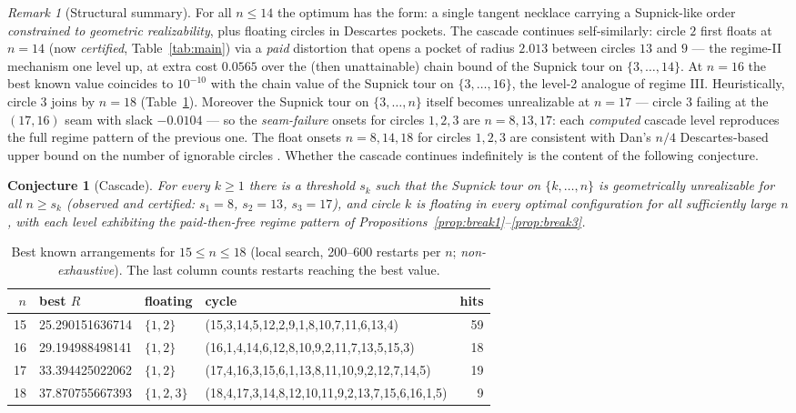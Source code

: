 \documentclass[11pt]{article}
\newtheorem{conjecture}[theorem]{Conjecture}
\theoremstyle{definition}
\theoremstyle{remark}
\newtheorem{remark}[theorem]{Remark}
\begin{document}
\begin{remark}[Structural summary]
For all $n\le14$ the optimum has the form: a single tangent necklace carrying a Supnick-like order \emph{constrained to geometric realizability}, plus floating circles in Descartes pockets. The cascade continues self-similarly: circle $2$ first floats at $n=14$ (now \emph{certified}, Table~\ref{tab:main}) via a \emph{paid} distortion that opens a pocket of radius $2.013$ between circles $13$ and $9$ --- the regime-II mechanism one level up, at extra cost $0.0565$ over the (then unattainable) chain bound of the Supnick tour on $\{3,\dots,14\}$. At $n=16$ the best known value coincides to $10^{-10}$ with the chain value of the Supnick tour on $\{3,\dots,16\}$, the level-2 analogue of regime III. Heuristically, circle $3$ joins by $n=18$ (Table~\ref{tab:heur}). Moreover the Supnick tour on $\{3,\dots,n\}$ itself becomes unrealizable at $n=17$ --- circle $3$ failing at the $(17,16)$ seam with slack $-0.0104$ --- so the \emph{seam-failure} onsets for circles $1,2,3$ are $n=8,13,17$: each \emph{computed} cascade level reproduces the full regime pattern of the previous one. The float onsets $n=8,14,18$ for circles $1,2,3$ are consistent with Dan's $n/4$ Descartes-based upper bound on the number of ignorable circles \cite{mse}. Whether the cascade continues indefinitely is the content of the following conjecture.
\end{remark}

\begin{conjecture}[Cascade]\label{conj:cascade}
For every $k\ge1$ there is a threshold $s_k$ such that the Supnick tour on $\{k,\dots,n\}$ is geometrically unrealizable for all $n\ge s_k$ (observed and certified: $s_1=8$, $s_2=13$, $s_3=17$), and circle $k$ is floating in every optimal configuration for all sufficiently large $n$, with each level exhibiting the paid-then-free regime pattern of Propositions~\ref{prop:break1}--\ref{prop:break3}.
\end{conjecture}

\begin{table}[ht]\centering
\caption{Best known arrangements for $15\le n\le18$ (local search, 200--600 restarts per $n$; \emph{non-exhaustive}). The last column counts restarts reaching the best value.}
\label{tab:heur}
\small
\begin{tabular}{rlllr}
\toprule
$n$ & best $R$ & floating & cycle & hits \\
\midrule
15 & 25.290151636714 & $\{1,2\}$ & (15,3,14,5,12,2,9,1,8,10,7,11,6,13,4) & 59 \\
16 & 29.194988498141 & $\{1,2\}$ & (16,1,4,14,6,12,8,10,9,2,11,7,13,5,15,3) & 18 \\
17 & 33.394425022062 & $\{1,2\}$ & (17,4,16,3,15,6,1,13,8,11,10,9,2,12,7,14,5) & 19 \\
18 & 37.870755667393 & $\{1,2,3\}$ & (18,4,17,3,14,8,12,10,11,9,2,13,7,15,6,16,1,5) & 9 \\
\bottomrule
\end{tabular}
\end{table}
\end{document}

